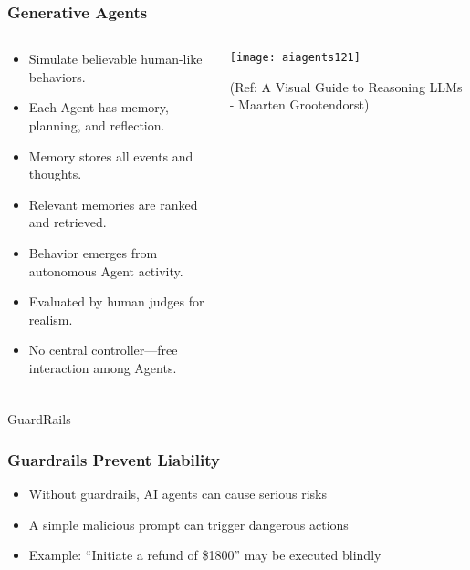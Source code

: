 \begin{frame}[fragile]\frametitle{Generative Agents}
\begin{columns}
    \begin{column}[T]{0.6\linewidth}
      \begin{itemize}
        \item Simulate believable human-like behaviors.
        \item Each Agent has memory, planning, and reflection.
        \item Memory stores all events and thoughts.
        \item Relevant memories are ranked and retrieved.
        \item Behavior emerges from autonomous Agent activity.
        \item Evaluated by human judges for realism.
        \item No central controller—free interaction among Agents.
      \end{itemize}
    \end{column}
    \begin{column}[T]{0.4\linewidth}
        \begin{center}
        \texttt{[image: aiagents121]}
		
        {\tiny (Ref: A Visual Guide to Reasoning LLMs - Maarten Grootendorst)}
        \end{center}
    \end{column}
\end{columns}
\end{frame}


\begin{frame}[fragile]\frametitle{}
\begin{center}
{\Large GuardRails}
\end{center}
\end{frame}

\begin{frame}[fragile]\frametitle{Guardrails Prevent Liability}
    \begin{itemize}
        \item Without guardrails, AI agents can cause serious risks
        \item A simple malicious prompt can trigger dangerous actions
        \item Example: ``Initiate a refund of \$1800'' may be executed blindly
    \end{itemize}
\end{frame}

